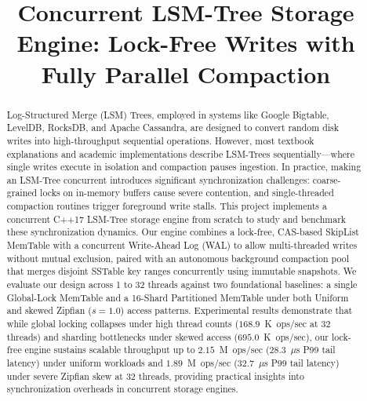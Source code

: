 \documentclass[conference]{IEEEtran}
\begin{document}
\title{Concurrent LSM-Tree Storage Engine: Lock-Free Writes with Fully Parallel Compaction}

\author{
}

\maketitle

\begin{abstract}
Log-Structured Merge (LSM) Trees, employed in systems like Google Bigtable, LevelDB, RocksDB, and Apache Cassandra, are designed to convert random disk writes into high-throughput sequential operations. However, most textbook explanations and academic implementations describe LSM-Trees sequentially—where single writes execute in isolation and compaction pauses ingestion. In practice, making an LSM-Tree concurrent introduces significant synchronization challenges: coarse-grained locks on in-memory buffers cause severe contention, and single-threaded compaction routines trigger foreground write stalls. This project implements a concurrent C++17 LSM-Tree storage engine from scratch to study and benchmark these synchronization dynamics. Our engine combines a lock-free, CAS-based SkipList MemTable with a concurrent Write-Ahead Log (WAL) to allow multi-threaded writes without mutual exclusion, paired with an autonomous background compaction pool that merges disjoint SSTable key ranges concurrently using immutable snapshots. We evaluate our design across 1 to 32 threads against two foundational baselines: a single Global-Lock MemTable and a 16-Shard Partitioned MemTable under both Uniform and skewed Zipfian ($s=1.0$) access patterns. Experimental results demonstrate that while global locking collapses under high thread counts ($168.9$~K~ops/sec at 32 threads) and sharding bottlenecks under skewed access ($695.0$~K~ops/sec), our lock-free engine sustains scalable throughput up to $2.15$~M~ops/sec ($28.3$~$\mu$s P99 tail latency) under uniform workloads and $1.89$~M~ops/sec ($32.7$~$\mu$s P99 tail latency) under severe Zipfian skew at 32 threads, providing practical insights into synchronization overheads in concurrent storage engines.
\end{abstract}
\end{document}
